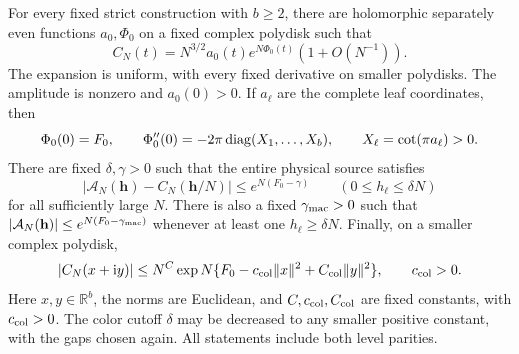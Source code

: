 \begin{theorem}\label{ca:strict-pure}
For every fixed strict construction with $b\ge2$, there are
holomorphic separately even functions $a_0,\Phi_0$ on a fixed complex
polydisk such that
\[
 C_N(t)=N^{3/2}a_0(t)e^{N\Phi_0(t)}(1+O(N^{-1})).
\]
The expansion is uniform, with every fixed derivative on smaller
polydisks. The amplitude is nonzero and $a_0(0)>0$. If $a_\ell$ are
the complete leaf coordinates, then
\begin{equation}\label{ca:strict-pure-hessian}
 \Phi_0(0)=F_0,\qquad
 \Phi_0''(0)=-2\pi\operatorname{diag}(X_1,\ldots,X_b),\qquad
 X_\ell=\cot(\pi a_\ell)>0.
\end{equation}
There are fixed $\delta,\gamma>0$ such that the entire physical
source satisfies
\begin{equation}\label{ca:source-error}
 |\mathcal A_N(\mathbf h)-C_N(\mathbf h/N)|
       \le e^{N(F_0-\gamma)}
       \qquad(0\le h_\ell\le\delta N)
\end{equation}
for all sufficiently large $N$. There is also a fixed $\gamma_{\rm mac}>0$ such that
$|\mathcal A_N(\mathbf h)|\le e^{N(F_0-\gamma_{\rm mac})}$
whenever at least one $h_\ell\ge\delta N$. Finally, on a smaller complex polydisk,
\begin{equation}\label{ca:color-gaussian}
 |C_N(x+\mathrm i y)|\le
 N^C\exp N\{F_0-c_{\rm col}\|x\|^2+C_{\rm col}\|y\|^2\},
 \qquad c_{\rm col}>0.
\end{equation}
Here $x,y\in\mathbb R^b$, the norms are Euclidean, and
$C,c_{\rm col},C_{\rm col}$ are fixed constants, with
$c_{\rm col}>0$. The color cutoff $\delta$ may be decreased to
any smaller positive constant, with the gaps chosen again. All
statements include both level parities.
\end{theorem}

